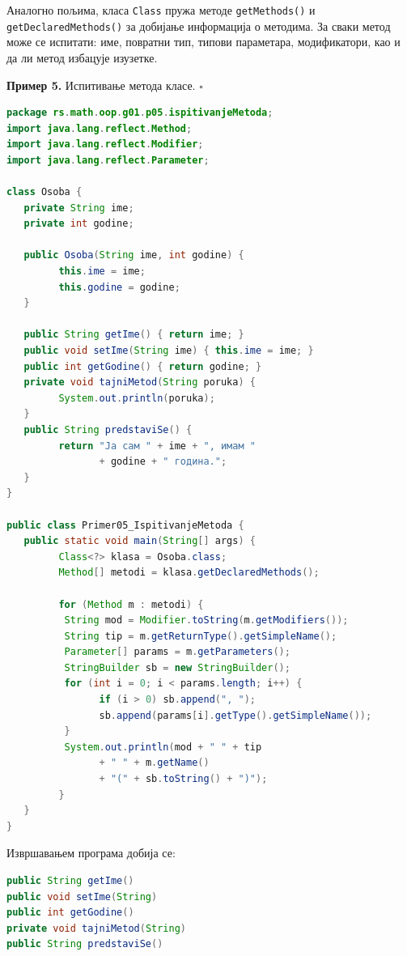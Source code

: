 Аналогно пољима, класа \texttt{Class} пружа методе \texttt{getMethods()} и \texttt{getDeclaredMethods()} за добијање информација о методима. За сваки метод може се испитати: име, повратни тип, типови параметара, модификатори, као и да ли метод избацује изузетке.


\bigskip

\noindent \textbf{Пример 5.} Испитивање метода класе. $\square$

\medskip

\begin{lstlisting}[language=Java]
package rs.math.oop.g01.p05.ispitivanjeMetoda;
import java.lang.reflect.Method;
import java.lang.reflect.Modifier;
import java.lang.reflect.Parameter;
 
class Osoba {
   private String ime;
   private int godine;
 
   public Osoba(String ime, int godine) {
         this.ime = ime;
         this.godine = godine;
   }
 
   public String getIme() { return ime; }
   public void setIme(String ime) { this.ime = ime; }
   public int getGodine() { return godine; }
   private void tajniMetod(String poruka) {
         System.out.println(poruka);
   }
   public String predstaviSe() {
         return "Ја сам " + ime + ", имам "
                + godine + " година.";
   }
}
 
public class Primer05_IspitivanjeMetoda {
   public static void main(String[] args) {
         Class<?> klasa = Osoba.class;
         Method[] metodi = klasa.getDeclaredMethods();
 
         for (Method m : metodi) {
          String mod = Modifier.toString(m.getModifiers());
          String tip = m.getReturnType().getSimpleName();
          Parameter[] params = m.getParameters();
          StringBuilder sb = new StringBuilder();
          for (int i = 0; i < params.length; i++) {
                if (i > 0) sb.append(", ");
                sb.append(params[i].getType().getSimpleName());
          }
          System.out.println(mod + " " + tip
                + " " + m.getName()
                + "(" + sb.toString() + ")");
         }
   }
}
\end{lstlisting}


Извршавањем програма добија се:

\begin{lstlisting}[language=Java]
public String getIme()
public void setIme(String)
public int getGodine()
private void tajniMetod(String)
public String predstaviSe()
\end{lstlisting}

